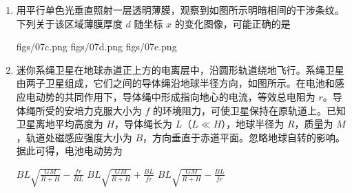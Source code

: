 \documentclass[\gkver]{gaokaozhenti}
\begin{document}
\begin{enumerate}
{	因在 $0 \leqslant x < \frac{\sqrt{2}}{2}a$ 区间内沿 $x$ 轴正向电势升高，则场强方向沿 $x$ 轴负向，则将 P 沿 $x$ 轴正向向右略微移动后释放，P 受到向右的电场力而向右运动。

	故选 C。
}

\item
用平行单色光垂直照射一层透明薄膜，观察到如图所示明暗相间的干涉条纹。下列关于该区域薄膜厚度 $d$ 随坐标 $x$ 的变化图像，可能正确的是 


{figs/07c.png}
{figs/07d.png}
{figs/07e.png}


\item
迷你系绳卫星在地球赤道正上方的电离层中，沿圆形轨道绕地飞行。系绳卫星由两子卫星组成，它们之间的导体绳沿地球半径方向，如图所示。在电池和感应电动势的共同作用下，导体绳中形成指向地心的电流，等效总电阻为 $r$。导体绳所受的安培力克服大小为 $f$ 的环境阻力，可使卫星保持在原轨道上。已知卫星离地平均高度为 $H$，导体绳长为 $L$（$L \ll H$），地球半径为 $R$，质量为 $M$，轨道处磁感应强度大小为 $B$，方向垂直于赤道平面。忽略地球自转的影响。据此可得，电池电动势为 


{$BL\sqrt{\frac{GM}{R+H}} - \frac{fr}{BL}$}
{$BL\sqrt{\frac{GM}{R+H}} + \frac{BL}{fr}$}
{$BL\sqrt{\frac{GM}{R+H}} - \frac{BL}{fr}$}

\end{enumerate}
\end{document}
